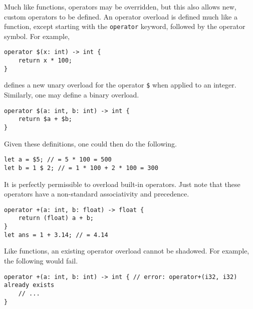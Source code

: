Much like functions, operators may be overridden, but this also allows new, custom operators to be defined.
An operator overload is defined much like a function, except starting with the \texttt{operator} keyword, followed by the operator symbol.
For example,

\begin{lstlisting}[language=CustomLang]
operator $(x: int) -> int {
    return x * 100;
}
\end{lstlisting}

defines a new unary overload for the operator \texttt{\$} when applied to an integer.
Similarly, one may define a binary overload.

\begin{lstlisting}[language=CustomLang]
operator $(a: int, b: int) -> int {
    return $a + $b;
}
\end{lstlisting}

Given these definitions, one could then do the following.

\begin{lstlisting}[language=CustomLang]
let a = $5; // = 5 * 100 = 500
let b = 1 $ 2; // = 1 * 100 + 2 * 100 = 300
\end{lstlisting}

It is perfectly permissible to overload built-in operators.
Just note that these operators have a non-standard associativity and precedence.

\begin{lstlisting}[language=CustomLang]
operator +(a: int, b: float) -> float {
    return (float) a + b;
}
let ans = 1 + 3.14; // = 4.14
\end{lstlisting}

Like functions, an existing operator overload cannot be shadowed.
For example, the following would fail.

\begin{lstlisting}[language=CustomLang]
operator +(a: int, b: int) -> int { // error: operator+(i32, i32) already exists
    // ...
}
\end{lstlisting}
